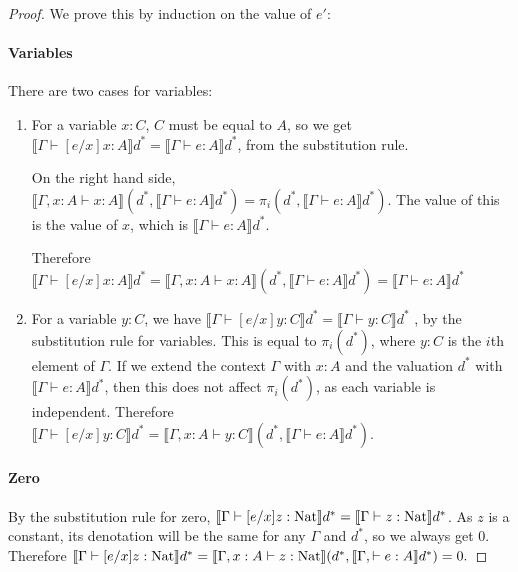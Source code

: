 \begin{proof}

We prove this by induction on the value of $e'$:

\paragraph{Variables} There are two cases for variables:
\begin{enumerate}
\item{For a variable $x : C$, $C$ must be equal to $A$, so we get $\llbracket \Gamma \vdash [e/x]x : A \rrbracket d^* = \llbracket \Gamma \vdash e : A \rrbracket d^*$, from the substitution rule. 

On the right hand side, $\llbracket \Gamma , x : A \vdash x : A \rrbracket(d^* , \llbracket \Gamma \vdash e : A \rrbracket d^*) = \pi_i(d^* , \llbracket \Gamma \vdash e : A \rrbracket d^*)$. The value of this is the value of $x$, which is $\llbracket \Gamma \vdash e : A \rrbracket d^*$.

Therefore $\llbracket \Gamma \vdash [e/x]x : A \rrbracket d^* = \llbracket \Gamma , x : A \vdash x : A \rrbracket(d^* , \llbracket \Gamma \vdash e : A \rrbracket d^*) = \llbracket \Gamma \vdash e : A \rrbracket d^*$ }
\item{For a variable $y: C$, we have $\llbracket \Gamma \vdash [e/x]y : C \rrbracket d^* = \llbracket \Gamma \vdash y : C \rrbracket d^*$ , by the substitution rule for variables. This is equal to $\pi_i(d^*)$, where $y : C$ is the $i$th element of $\Gamma$. If we extend the context $\Gamma$ with $x:A$ and the valuation $d^*$ with $\llbracket \Gamma \vdash e : A \rrbracket d^*$, then this does not affect $\pi_i(d^*)$, as each variable is independent. Therefore $\llbracket \Gamma \vdash [e/x]y : C \rrbracket d^* =\llbracket \Gamma, x : A \vdash y: C \rrbracket (d^*, \llbracket \Gamma \vdash e : A \rrbracket d^*).$}
\end{enumerate}

\paragraph{Zero} By the substitution rule for zero, $\llbracket \Gamma \vdash [e/x]z : \operatorname{Nat} \rrbracket d^* = \llbracket \Gamma \vdash z : \operatorname{Nat} \rrbracket d^*$. As $z$ is a constant, its denotation will be the same for any $\Gamma$ and $d^*$, so we always get 0. Therefore $\llbracket \Gamma \vdash [e/x]z : \operatorname{Nat} \rrbracket d^* = \llbracket \Gamma, x : A \vdash z : \operatorname{Nat} \rrbracket (d^*, \llbracket \Gamma , \vdash e : A \rrbracket d^*) = 0.$


\end{proof}
